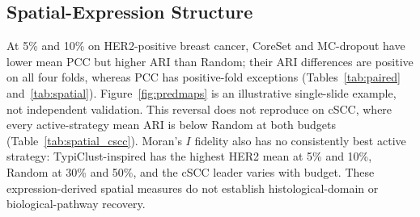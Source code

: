 \documentclass[]{spie}
\begin{document}
\begin{table}[htbp]
\centering
\caption{cSCC PCC, mean $\pm$ SD over four folds. Bold marks the largest mean per budget.}
\label{tab:pcc_cscc}
\end{table}

\subsection{Spatial-Expression Structure}

At 5\% and 10\% on HER2-positive breast cancer, CoreSet and MC-dropout have lower mean PCC but higher ARI than Random; their ARI differences are positive on all four folds, whereas PCC has positive-fold exceptions (Tables~\ref{tab:paired} and~\ref{tab:spatial}). Figure~\ref{fig:predmaps} is an illustrative single-slide example, not independent validation. This reversal does not reproduce on cSCC, where every active-strategy mean ARI is below Random at both budgets (Table~\ref{tab:spatial_cscc}). Moran's $I$ fidelity also has no consistently best active strategy: TypiClust-inspired has the highest HER2 mean at 5\% and 10\%, Random at 30\% and 50\%, and the cSCC leader varies with budget. These expression-derived spatial measures do not establish histological-domain or biological-pathway recovery.
\end{document}
